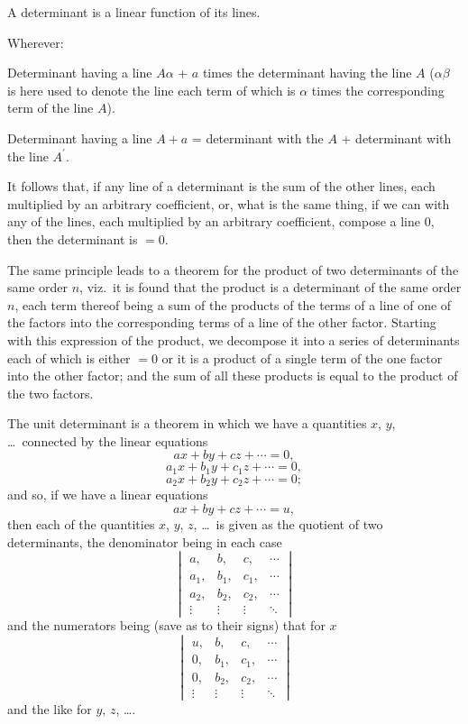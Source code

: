 \documentclass[11pt,a4paper]{book}
\begin{document}
A determinant is a linear function of its lines.

Wherever:

Determinant having a line $A$\;$\alpha$ + $a$ times the determinant having the line $A$ ($\alpha\beta$
is here used to denote the line each term of which is $\alpha$ times the corresponding term
of the line $A$).

\clearpage

\noindent
Determinant having a line $A + a$ = determinant with the $A$ + determinant with the
line $A^\prime$.

It follows that, if any line of a determinant is the sum of the other lines, each
multiplied by an arbitrary coefficient, or, what is the same thing, if we can with any
of the lines, each multiplied by an arbitrary coefficient, compose a line $0$, then the
determinant is $= 0$.

The same principle leads to a theorem for the product of two determinants of the
same order $n$, viz.\ it is found that the product is a determinant of the same order $n$,
each term thereof being a sum of the products of the terms of a line of one of the
factors into the corresponding terms of a line of the other factor.  Starting with this
expression of the product, we decompose it into a series of determinants each of which
is either $= 0$ or it is a product of a single term of the one factor into the other
factor; and the sum of all these products is equal to the product of the two factors.

The unit determinant is a theorem in which we have a quantities $x$, $y$, \dots\ connected by the linear equations
\[
ax + by + cz + \cdots = 0,
\]
\[
a_1x + b_1y + c_1z + \cdots = 0,
\]
\[
a_2x + b_2y + c_2z + \cdots = 0;
\]
and so, if we have a linear equations
\[
ax + by + cz + \cdots = u,
\]
then each of the quantities $x$, $y$, $z$, \dots\ is given as the quotient of two determinants,
the denominator being in each case
\[
\begin{vmatrix} a, & b, & c, & \cdots \\ a_1, & b_1, & c_1, & \cdots \\ a_2, & b_2, & c_2, & \cdots \\ \vdots & \vdots & \vdots & \ddots \end{vmatrix}
\]
and the numerators being (save as to their signs) that for $x$
\[
\begin{vmatrix} u, & b, & c, & \cdots \\ 0, & b_1, & c_1, & \cdots \\ 0, & b_2, & c_2, & \cdots \\ \vdots & \vdots & \vdots & \ddots \end{vmatrix}
\]
and the like for $y$, $z$, \dots.
\end{document}
